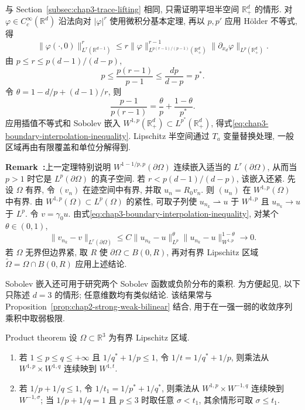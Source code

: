 \begin{Proof}
与 Section~\ref{subsec:chap3-trace-lifting} 相同, 只需证明平坦半空间 $\mathbb R_+^d$ 的情形. 对 $\varphi\in C_c^\infty(\mathbb R^d)$ 沿法向对 $|\varphi|^r$ 使用微积分基本定理, 再以 $p,p'$ 应用 H\"older 不等式, 得
\[
 \|\varphi(\cdot,0)\|_{L^r(\mathbb R^{d-1})}^r
 \leq r\|\varphi\|_{L^{p(r-1)/(p-1)}(\mathbb R_+^d)}^{r-1}
 \|\partial_{x_d}\varphi\|_{L^p(\mathbb R_+^d)}.
\]
由 $p\leq r\leq p(d-1)/(d-p)$,
\[
 p\leq\frac{p(r-1)}{p-1}\leq\frac{dp}{d-p}=p^*.
\]
令 $\theta=1-d/p+(d-1)/r$, 则
\[
 \frac{p-1}{p(r-1)}=\frac\theta p+\frac{1-\theta}{p^*}.
\]
应用插值不等式和 Sobolev 嵌入 $W^{1,p}(\mathbb R_+^d)\subset L^{p^*}(\mathbb R_+^d)$, 得式\eqref{eq:chap3-boundary-interpolation-inequality}. Lipschitz 半空间通过 $T_a$ 变量替换处理, 一般区域再由有限覆盖和单位分解得到.
\end{Proof}

\par\noindent{}\textbf{Remark~\thechapterthreesectiontworemark:}\label{rem:chap3-trace-compactness}\quad 上一定理特别说明 $W^{1-1/p,p}(\partial\Omega)$ 连续嵌入适当的 $L^r(\partial\Omega)$, 从而当 $p>1$ 时它是 $L^p(\partial\Omega)$ 的真子空间. 若 $r<p(d-1)/(d-p)$, 该嵌入还紧. 先设 $\Omega$ 有界, 令 $(v_n)$ 在迹空间中有界, 并取 $u_n=R_0v_n$. 则 $(u_n)$ 在 $W^{1,p}(\Omega)$ 中有界. 由 $W^{1,p}(\Omega)\subset L^p(\Omega)$ 的紧性, 可取子列使 $u_{n_k}\rightharpoonup u$ 于 $W^{1,p}$ 且 $u_{n_k}\to u$ 于 $L^p$. 令 $v=\gamma_0u$. 由式\eqref{eq:chap3-boundary-interpolation-inequality}, 对某个 $\theta\in(0,1)$,
\[
 \|v_{n_k}-v\|_{L^r(\partial\Omega)}
 \leq C\|u_{n_k}-u\|_{L^p}^\theta
 \|u_{n_k}-u\|_{W^{1,p}}^{1-\theta}\longrightarrow0.
\]
若 $\Omega$ 无界但边界紧, 取 $R$ 使 $\partial\Omega\subset B(0,R)$, 再对有界 Lipschitz 区域 $\widetilde\Omega=\Omega\cap B(0,R)$ 应用上述结论.

Sobolev 嵌入还可用于研究两个 Sobolev 函数或负阶分布的乘积. 为方便起见, 以下只陈述 $d=3$ 的情形; 任意维数均有类似结论. 该结果常与 Proposition~\ref{prop:chap2-strong-weak-bilinear} 结合, 用于在一强一弱的收敛序列乘积中取弱极限.

\begin{Theorem}{Product theorem}
\label{thm:chap3-sobolev-product}
设 $\Omega\subset\mathbb R^3$ 为有界 Lipschitz 区域.
\begin{enumerate}
\item 若 $1\leq p\leq q\leq+\infty$ 且 $1/q^*+1/p\leq1$, 令 $1/t=1/q^*+1/p$, 则乘法从 $W^{1,p}\times W^{1,q}$ 连续映到 $W^{1,t}$.
\item 若 $1/p+1/q\leq1$, 令 $1/t_1=1/p^*+1/q^*$, 则乘法从 $W^{1,p}\times W^{-1,q}$ 连续映到 $W^{-1,\sigma}$; 当 $1/p+1/q=1$ 且 $p\leq3$ 时取任意 $\sigma<t_1$, 其余情形可取 $\sigma\leq t_1$.
\end{enumerate}
\end{Theorem}

